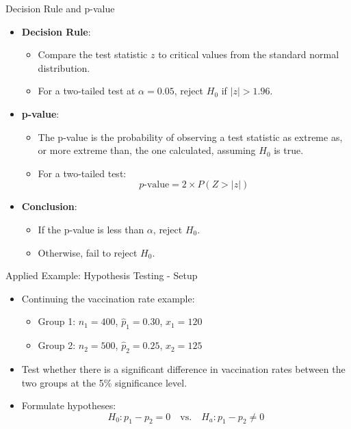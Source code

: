 \documentclass[handout]{beamer} %
\begin{document}
\begin{frame}{Decision Rule and p-value}
  \begin{itemize}
    \item \textbf{Decision Rule}:
      \begin{itemize}
        \item Compare the test statistic $z$ to critical values from the standard normal distribution.
        \item For a two-tailed test at $\alpha = 0.05$, reject $H_0$ if $|z| > 1.96$.
      \end{itemize}
    \item \textbf{p-value}:
      \begin{itemize}
        \item The p-value is the probability of observing a test statistic as extreme as, or more extreme than, the one calculated, assuming $H_0$ is true.
        \item For a two-tailed test:
        \[
        p\text{-value} = 2 \times P(Z > |z|)
        \]
      \end{itemize}
    \item \textbf{Conclusion}:
      \begin{itemize}
        \item If the p-value is less than $\alpha$, reject $H_0$.
        \item Otherwise, fail to reject $H_0$.
      \end{itemize}
  \end{itemize}
\end{frame}

\begin{frame}{Applied Example: Hypothesis Testing - Setup}
  \begin{itemize}
    \item Continuing the vaccination rate example:
      \begin{itemize}
        \item Group 1: $n_1 = 400$, $\hat{p}_1 = 0.30$, $x_1 = 120$
        \item Group 2: $n_2 = 500$, $\hat{p}_2 = 0.25$, $x_2 = 125$
      \end{itemize}
    \item Test whether there is a significant difference in vaccination rates between the two groups at the 5\% significance level.
    \item Formulate hypotheses:
      \[
      H_0: p_1 - p_2 = 0 \quad \text{vs.} \quad H_a: p_1 - p_2 \neq 0
      \]
  \end{itemize}
\end{frame}
\end{document}
